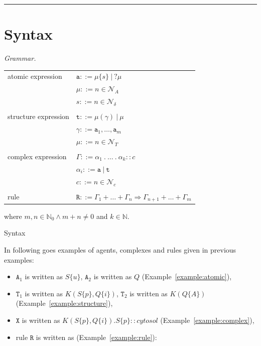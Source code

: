\documentclass[12pt]{fithesis2}
\begin{document}
\noindent\rule{\textwidth}{2pt}

\section{Syntax}

\begin{definition}
\textit{Grammar.}

\begin{center}
\begin{tabular}{ l l }
atomic expression & $\mathtt{a} ::= \mu\{s\} ~|~ ? \mu$\\
 & $\mu ::= n \in \mathcal{N}_{A}$ \\
 & $s ::= n \in \mathcal{N}_{\delta}$\\
 & \\
structure expression & $\mathtt{t} ::= \mu(\gamma) ~|~ \mu$\\
 & $\gamma ::= \mathtt{a}_1, \ldots, \mathtt{a}_m$ \\
 & $\mu ::= n \in \mathcal{N}_{T}$\\
 & \\
complex expression & $\Gamma ::= \alpha_1~.~\ldots~.~\alpha_k :: c$\\
 & $\alpha_i ::= \mathtt{a} ~|~ \mathtt{t}$\\
 & $c ::= n \in \mathcal{N}_{c}$\\
 & \\
rule & $\mathtt{R} ::= \Gamma_1 + \ldots + \Gamma_n \Rightarrow \Gamma_{n+1} + \ldots + \Gamma_m $
\end{tabular}

\end{center}
where $m,n \in \mathbb{N}_0 \wedge m + n \neq 0$ and $k \in \mathbb{N}$.
\end{definition}

\begin{example}{Syntax}\label{example:syntax}

In following goes examples of agents, complexes and rules given in previous examples:

\begin{itemize}
\item $\mathtt{A}_1$ is written as $S\{u\}$, $\mathtt{A}_2$ is written as $Q$ (Example~\ref{example:atomic}),

\item $\mathtt{T}_1$ is written as $K(S\{p\}, Q\{i\})$, $\mathtt{T}_2$ is written as $K(Q\{A\})$ (Example~\ref{example:structure}),

\item $\mathtt{X}$ is written as $K(S\{p\}, Q\{i\}).S\{p\}::cytosol$ (Example~\ref{example:complex}),

\item rule $\mathtt{R}$ is written as (Example~\ref{example:rule}):
\end{itemize}

\end{example}
\end{document}
